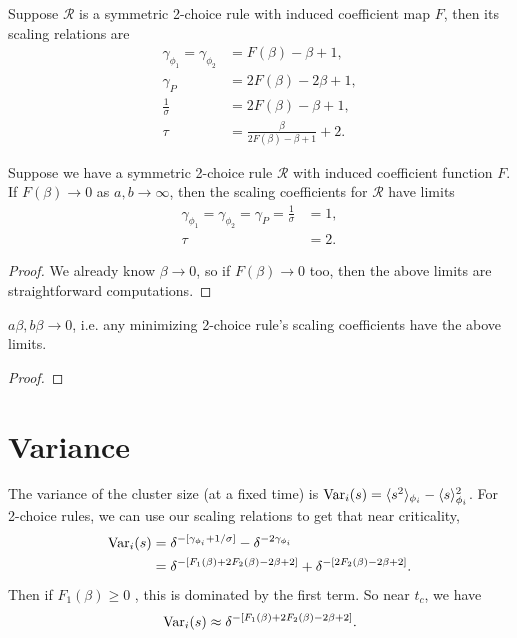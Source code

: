\documentclass[twoside,10pt]{article}
\begin{document}
Suppose $\mathcal{R}$ is a symmetric 2-choice rule with induced coefficient map $F$, then its scaling relations are
\begin{align*}
	\gamma_{\phi_1} = \gamma_{\phi_2} &= F(\beta)-\beta+1,\\
	\gamma_{P} &= 2F(\beta) - 2\beta+1,\\
	\frac{1}{\sigma}  &= 2F(\beta)-\beta+1,\\
	\tau &= \frac{\beta}{2F(\beta)-\beta+1} +2.
\end{align*}

\begin{prop}[]
	Suppose we have a symmetric 2-choice rule $\mathcal{R}$ with induced coefficient function $F$. If $F(\beta) \to 0$ as $a,b \to \infty$, then the scaling coefficients for $\mathcal{R}$ have limits
	\begin{align*}
		\gamma_{\phi_1} = \gamma_{\phi_2} = \gamma_{P} = \frac{1}{\sigma} &= 1,\\
		\tau &= 2.
	\end{align*}
\end{prop}
\begin{proof}
	We already know $\beta \to 0$, so if $F(\beta)\to 0$ too, then the above limits are straightforward computations.
\end{proof}

\begin{thrm}[]
	\label{thrm:m-beta-0}
$a \beta, b \beta \to 0$, i.e. any minimizing 2-choice rule's scaling coefficients have the above limits.
\end{thrm}
\begin{proof}
\end{proof}

\section{Variance}

The variance of the cluster size (at a fixed time) is $\operatorname{Var}_i(s) = \langle s^2 \rangle_{\phi_i} - \langle s \rangle^2_{\phi_i}$. For 2-choice rules, we can use our scaling relations to get that near criticality,
\begin{align*}
	\operatorname{Var}_i(s) &= \delta^{-[\gamma_{\phi_i} + 1/\sigma]} - \delta^{-2\gamma_{\phi_i}} \\
		  &= \delta^{-[F_1(\beta)+2F_2(\beta)-2\beta+2]} + \delta^{-[2F_2(\beta)-2\beta+2]}.
\end{align*}
Then if $F_1(\beta) \geq 0$ , this is dominated by the first term. So near $t_c$, we have
\[
	\operatorname{Var}_i(s) \approx \delta^{-[F_1(\beta)+2F_2(\beta)-2\beta+2]}.
\] 
\end{document}
